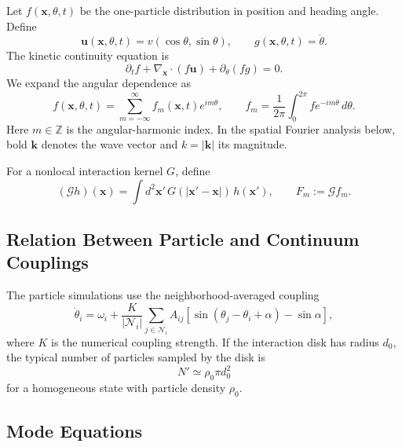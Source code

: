 \documentclass[11pt]{article}
\numberwithin{equation}{section}
\begin{document}
Let $f(\mathbf x,\theta,t)$ be the one-particle distribution in position
and heading angle. Define
\begin{equation}
  \mathbf u(\mathbf x,\theta,t)=v(\cos\theta,\sin\theta),
  \qquad
  g(\mathbf x,\theta,t)=\dot\theta .
\end{equation}
The kinetic continuity equation is
\begin{equation}
  \partial_t f+\nabla_{\mathbf x}\cdot(f\mathbf u)+\partial_\theta(fg)=0.
  \label{eq:kinetic_continuity}
\end{equation}
We expand the angular dependence as
\begin{equation}
  f(\mathbf x,\theta,t)=\sum_{m=-\infty}^{\infty}f_m(\mathbf x,t)e^{im\theta},
  \qquad
  f_m=\frac{1}{2\pi}\int_0^{2\pi}f e^{-im\theta}\,d\theta .
  \label{eq:angular_modes}
\end{equation}
Here $m\in\mathbb Z$ is the angular-harmonic index. In the spatial
Fourier analysis below, bold $\mathbf k$ denotes the wave vector and
$k=|\mathbf k|$ its magnitude.

For a nonlocal interaction kernel $G$, define
\begin{equation}
  (\mathcal G h)(\mathbf x)=
  \int d^2\mathbf x'\,G(|\mathbf x'-\mathbf x|)\,h(\mathbf x'),
  \qquad
  F_m:=\mathcal G f_m .
\end{equation}

\subsection{Relation Between Particle and Continuum Couplings}

The particle simulations use the neighborhood-averaged coupling
\begin{equation}
  \dot\theta_i=\omega_i+
  \frac{K}{|\mathcal N_i|}
  \sum_{j\in\mathcal N_i}A_{ij}
  [\sin(\theta_j-\theta_i+\alpha)-\sin\alpha],
  \label{eq:particle_coupling_appendix}
\end{equation}
where $K$ is the numerical coupling strength. If the interaction disk has
radius $d_0$, the typical number of particles sampled by the disk is
\begin{equation}
  N'\simeq \rho_0\pi d_0^2
\end{equation}
for a homogeneous state with particle density $\rho_0$.

\subsection{Mode Equations}
\end{document}
